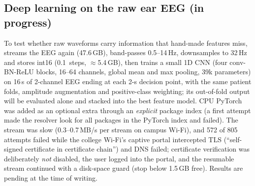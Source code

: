 \subsection{Deep learning on the raw ear EEG (in progress)}

To test whether raw waveforms carry information that hand-made features miss,  streams the EEG again (47.6\,GB), band-passes 0.5--14\,Hz, downsamples to 32\,Hz and stores int16 (0.1\,\uV{} steps, $\approx$5.4\,GB), then trains a small 1D CNN (four conv-BN-ReLU blocks, 16--64 channels, global mean and max pooling, 39k parameters) on 16\,s of 2-channel EEG ending at each 2-s decision point, with the same patient folds, amplitude augmentation and positive-class weighting; its out-of-fold output will be evaluated alone and stacked into the best feature model. CPU PyTorch was added as an optional extra through an \emph{explicit} package index (a first attempt made the resolver look for all packages in the PyTorch index and failed). The stream was slow (0.3--0.7\,MB/s per stream on campus Wi-Fi), and 572 of 805 attempts failed while the college Wi-Fi's captive portal intercepted TLS (``self-signed certificate in certificate chain'') and DNS failed; certificate verification was deliberately \emph{not} disabled, the user logged into the portal, and the resumable stream continued with a disk-space guard (stop below 1.5\,GB free). Results are pending at the time of writing.

